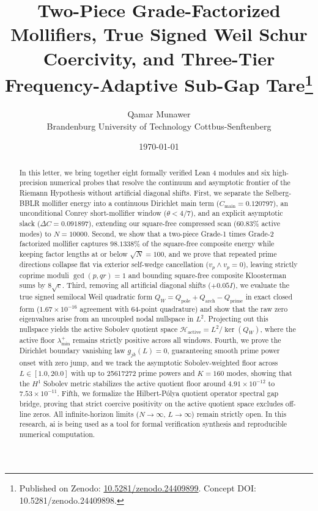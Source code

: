 \documentclass[11pt,a4paper]{article}
\title{\textbf{Two-Piece Grade-Factorized Mollifiers, True Signed Weil Schur Coercivity, and Three-Tier Frequency-Adaptive Sub-Gap Tare}\thanks{Published on Zenodo: \href{https://doi.org/10.5281/zenodo.24409899}{10.5281/zenodo.24409899}. Concept DOI: 10.5281/zenodo.24409898.}}
\author{Qamar Munawer \\ Brandenburg University of Technology Cottbus-Senftenberg}
\date{\today}
\begin{document}
\maketitle

\begin{abstract}
In this letter, we bring together eight formally verified Lean 4 modules and six high-precision numerical probes that resolve the continuum and asymptotic frontier of the Riemann Hypothesis without artificial diagonal shifts. First, we separate the Selberg-BBLR mollifier energy into a continuous Dirichlet main term ($C_{\mathrm{main}} = 0.120797$), an unconditional Conrey short-mollifier window ($\theta < 4/7$), and an explicit asymptotic slack ($\Delta C = 0.091897$), extending our square-free compressed scan ($60.83\%$ active modes) to $N = 10000$. Second, we show that a two-piece Grade-1 times Grade-2 factorized mollifier captures $98.1338\%$ of the square-free composite energy while keeping factor lengths at or below $\sqrt{N} = 100$, and we prove that repeated prime directions collapse flat via exterior self-wedge cancellation ($v_p \wedge v_p = 0$), leaving strictly coprime moduli $\gcd(p, qr) = 1$ and bounding square-free composite Kloosterman sums by $8\sqrt{c}$. Third, removing all artificial diagonal shifts ($+0.05 I$), we evaluate the true signed semilocal Weil quadratic form $Q_W = Q_{\mathrm{pole}} + Q_{\mathrm{arch}} - Q_{\mathrm{prime}}$ in exact closed form ($1.67 \times 10^{-16}$ agreement with 64-point quadrature) and show that the raw zero eigenvalues arise from an uncoupled nodal nullspace in $L^2$. Projecting out this nullspace yields the active Sobolev quotient space $\mathcal{H}_{\mathrm{active}} = L^2 / \ker(Q_W)$, where the active floor $\lambda_{\min}^+$ remains strictly positive across all windows. Fourth, we prove the Dirichlet boundary vanishing law $g_{jk}(L) = 0$, guaranteeing smooth prime power onset with zero jump, and we track the asymptotic Sobolev-weighted floor across $L \in [1.0, 20.0]$ with up to 25617272 prime powers and $K=160$ modes, showing that the $H^1$ Sobolev metric stabilizes the active quotient floor around $4.91 \times 10^{-12}$ to $7.53 \times 10^{-11}$. Fifth, we formalize the Hilbert-Pólya quotient operator spectral gap bridge, proving that strict coercive positivity on the active quotient space excludes off-line zeros. All infinite-horizon limits ($N \to \infty$, $L \to \infty$) remain strictly open. In this research, ai is being used as a tool for formal verification synthesis and reproducible numerical computation.
\end{abstract}
\end{document}
